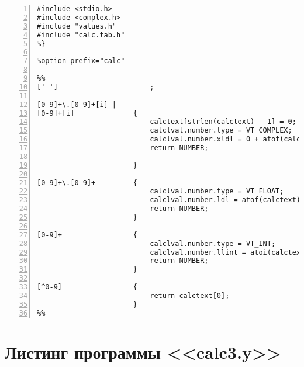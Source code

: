 \documentclass[bachelor, och, coursework, times]{SCWorks}
\begin{document}
\begin{Verbatim}[fontsize=\small, numbers=left]
%{
#include <stdio.h>
#include <complex.h>
#include "values.h"
#include "calc.tab.h"
%}

%option prefix="calc"

%%
[' ']                      ;

[0-9]+\.[0-9]+[i] | 
[0-9]+[i]              {
                           calctext[strlen(calctext) - 1] = 0;
                           calclval.number.type = VT_COMPLEX;
                           calclval.number.xldl = 0 + atof(calctext) * I;
                           return NUMBER;

                       }

[0-9]+\.[0-9]+         {
                           calclval.number.type = VT_FLOAT;
                           calclval.number.ldl = atof(calctext);
                           return NUMBER;
                       }

[0-9]+                 {
                           calclval.number.type = VT_INT;
                           calclval.number.llint = atoi(calctext);
                           return NUMBER;
                       }

[^0-9]                 {             
                           return calctext[0]; 
                       }
%%
\end{Verbatim}

\section{Листинг программы <<calc3.y>>}\label{pril-7}
\end{document}
